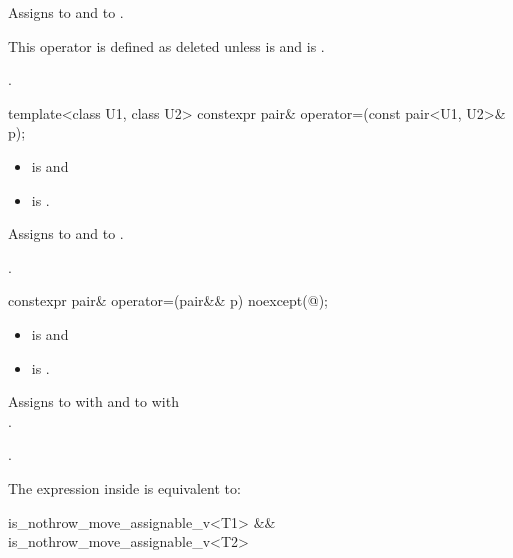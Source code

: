 \begin{itemdescr}
\pnum
\effects
Assigns  to  and  to .

\pnum
\remarks
This operator is defined as deleted unless
 is  and
 is .

\pnum
\returns
{}.
\end{itemdescr}

%
\begin{itemdecl}
template<class U1, class U2> constexpr pair& operator=(const pair<U1, U2>& p);
\end{itemdecl}

\begin{itemdescr}
\pnum
\constraints
\begin{itemize}
\item {} is  and
\item {} is .
\end{itemize}

\pnum
\effects
Assigns  to  and  to .

\pnum
\returns
{}.
\end{itemdescr}

%
\begin{itemdecl}
constexpr pair& operator=(pair&& p) noexcept(@\seebelow@);
\end{itemdecl}

\begin{itemdescr}
\pnum
\constraints
\begin{itemize}
\item {} is  and
\item {} is .
\end{itemize}

\pnum
\effects
Assigns to  with 
and to  with\\ .

\pnum
\returns
{}.

\pnum
\remarks
The expression inside  is equivalent to:
\begin{codeblock}
is_nothrow_move_assignable_v<T1> && is_nothrow_move_assignable_v<T2>
\end{codeblock}
\end{itemdescr}

